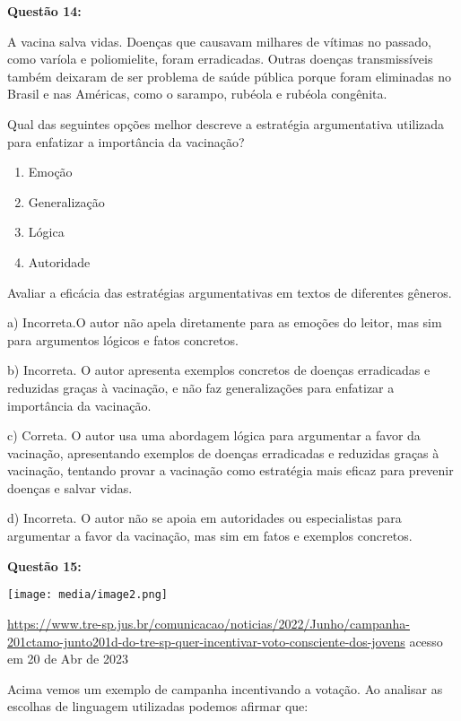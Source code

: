 \textbf{Questão 14:}

A vacina salva vidas. Doenças que causavam milhares de vítimas no
passado, como varíola e poliomielite, foram erradicadas. Outras doenças
transmissíveis também deixaram de ser problema de saúde pública porque
foram eliminadas no Brasil e nas Américas, como o sarampo, rubéola e
rubéola congênita.

Qual das seguintes opções melhor descreve a estratégia argumentativa
utilizada para enfatizar a importância da vacinação?

\begin{enumerate}
\def\labelenumi{\alph{enumi})}
\item
  Emoção
\item
  Generalização
\item
  Lógica
\item
  Autoridade
\end{enumerate}

Avaliar a eficácia das estratégias argumentativas em textos de
diferentes gêneros.

a) Incorreta.O autor não apela diretamente para as emoções do leitor,
mas sim para argumentos lógicos e fatos concretos.

b) Incorreta. O autor apresenta exemplos concretos de doenças
erradicadas e reduzidas graças à vacinação, e não faz generalizações
para enfatizar a importância da vacinação.

c) Correta. O autor usa uma abordagem lógica para argumentar a favor da
vacinação, apresentando exemplos de doenças erradicadas e reduzidas
graças à vacinação, tentando provar a vacinação como estratégia mais
eficaz para prevenir doenças e salvar vidas.

d) Incorreta. O autor não se apoia em autoridades ou especialistas para
argumentar a favor da vacinação, mas sim em fatos e exemplos concretos.

\textbf{Questão 15:}

\texttt{[image: media/image2.png]}

\href{https://www.tre-sp.jus.br/comunicacao/noticias/2022/Junho/campanha-201ctamo-junto201d-do-tre-sp-quer-incentivar-voto-consciente-dos-jovens}{{https://www.tre-sp.jus.br/comunicacao/noticias/2022/Junho/campanha-201ctamo-junto201d-do-tre-sp-quer-incentivar-voto-consciente-dos-jovens}}
acesso em 20 de Abr de 2023

Acima vemos um exemplo de campanha incentivando a votação. Ao analisar
as escolhas de linguagem utilizadas podemos afirmar que:

